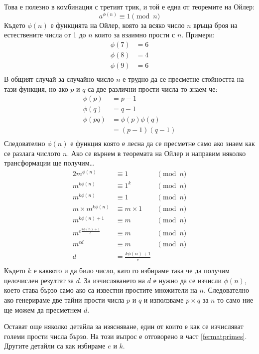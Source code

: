 Това е полезно в комбинация с третият трик, и той е една от теоремите на Ойлер:
$$a^{\phi(n)} \equiv 1 \pmod n$$
Където $\phi(n)$ е функцията на Ойлер, която за всяко число $n$ връща броя на естествените числа от 1 до $n$ които за взаимно прости с $n$. Примери:
\begin{equation*}
\begin{split}
\phi(7) &= 6 \\
\phi(8) &= 4 \\
\phi(9) &= 6 \\
\end{split}
\end{equation*}
В общият случай за случайно число $n$ е трудно да се пресметне стойността на тази функция, но ако $p$ и $q$ са две различни прости числа то знаем че:
\begin{equation*}
\begin{split}
\phi(p) &= p-1 \\
\phi(q) &= q-1 \\
\phi(pq) &= \phi(p)\phi(q) \\
&= (p-1)(q-1) \\
\end{split}
\end{equation*}
Следователно $\phi(n)$ е функция която е лесна да се пресметне само ако знаем как се разлага числото $n$. Ако се върнем в теоремата на Ойлер и направим няколко трансформации ще получим\ldots
\begin{alignat*}{2}
m^{\phi(n)} &\equiv 1 &\pmod n \\
m^{k\phi(n)} &\equiv 1^k &\pmod n \\
m^{k\phi(n)} &\equiv 1 &\pmod n \\
m\times m^{k\phi(n)} &\equiv m\times 1 &\pmod n \\
m^{k\phi(n)+1} &\equiv m &\pmod n \\
m^{e\frac{k\phi(n)+1}{e}} &\equiv m &\pmod n \\
m^{ed} &\equiv m &\pmod n\\
d &= \frac{k\phi(n)+1}{e} \\
\end{alignat*}
Където $k$ е каквото и да било число, като го избираме така че да получим целочислен резултат за $d$. За изчисляването на $d$ е нужно да се изчисли $\phi(n)$, което става бързо само ако са известни простите множители на $n$. Следователно ако генерираме две тайни прости числа $p$ и $q$ и използваме $p\times q$ за $n$ то само ние ще можем да пресметнем $d$.

Остават още няколко детайла за изясняване, един от които е как се изчисляват големи прости числа бързо. На този въпрос е отговорено в част \ref{fermatprimes}. Другите детайли са как избираме $e$ и $k$.

